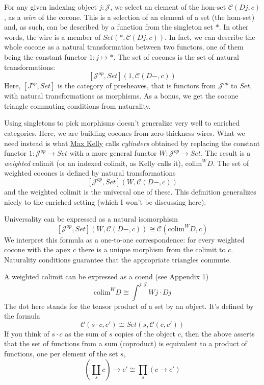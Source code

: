 \documentclass[11pt]{amsart}
\begin{document}
\begin{figure}[H]
\end{figure}
For any given indexing object $j \colon \mathcal{J}$, we select an element of the hom-set $\mathcal{C}(D j, c)$, as a \emph{wire} of the cocone. This is a selection of an element of a set (the hom-set) and, as such, can be described by a function from the singleton set $*$. In other words, the wire is a member of $Set(*, \mathcal{C}(D j, c))$. In fact, we can describe the whole cocone as a natural transformation between two functors, one of them being the constant functor $1 \colon j \mapsto *$. The set of cocones is the set of natural transformations:
\[ [\mathcal{J}^{op}, Set](1, \mathcal{C}(D -, c))\]
Here, $[J^{op}, Set]$ is the category of presheaves, that is functors from $\mathcal{J}^{op}$ to $Set$, with natural transformations as morphisms. As a bonus, we get the cocone triangle commuting conditions from naturality. 

Using singletons to pick morphisms doesn't generalize very well to enriched categories. Here, we are building cocones from zero-thickness wires. What we need instead is what \href{http://www.tac.mta.ca/tac/reprints/articles/10/tr10.pdf}{Max Kelly} calls \emph{cylinders} obtained by replacing the constant functor $1\colon \mathcal{J}^{op} \to Set$ with a more general functor $W \colon \mathcal{J}^{op} \to Set$. The result is a \emph{weighted} colimit (or an indexed colimit, as Kelly calls it), $\mbox{colim}^W D$. The set of weighted cocones is defined by natural transformations
\[ [\mathcal{J}^{op}, Set](W, \mathcal{C}(D -, c))\]
and the weighted colimit is the universal one of these. This definition generalizes nicely to the enriched setting (which I won't be discussing here). 

Universality can be expressed as a natural isomorphism
\[[\mathcal{J}^{op}, Set](W, \mathcal{C}(D -, c))  \cong  \mathcal{C}(\mbox{colim}^W D, c)\]
We interpret this formula as a one-to-one correspondence: for every weighted cocone with the apex $c$ there is a unique morphism from the colimit to $c$. Naturality conditions guarantee that the appropriate triangles commute.

A weighted colimit can be expressed as a coend (see Appendix 1)
\[\mbox{colim}^W D \cong \int^{j \colon \mathcal{J}} W j \cdot D j\]
The dot here stands for the tensor product of a set by an object. It's defined by the formula
\[\mathcal{C}(s \cdot c, c') \cong Set(s, \mathcal{C}(c, c'))\]
If you think of $s \cdot c$ as the sum of $s$ copies of the object $c$, then the above asserts that the set of functions from a sum (coproduct) is equivalent to a product of functions, one per element of the set $s$,
\[(\coprod_s c) \to c' \cong \prod_s (c \to c')\]
 
\end{document}
